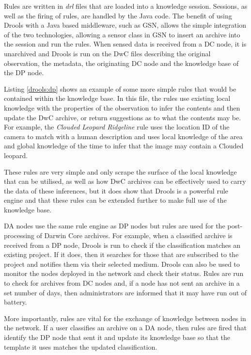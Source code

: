		Rules are written in \textit{drl} files that are loaded into a knowledge session. Sessions, as well as the firing of rules, are handled by the Java code. The benefit of using Drools with a Java based middleware, such as GSN, allows the simple integration of the two technologies, allowing a sensor class in GSN to insert an archive into the session and run the rules. When sensed data is received from a DC node, it is unarchived and Drools is run on the DwC files describing the original observation, the metadata, the originating DC node and the knowledge base of the DP node.
		
		Listing \ref{drools:dp} shows an example of some more simple rules that would be contained within the knowledge base. In this file, the rules use existing local knowledge with the properties of the observation to infer the contents and then update the DwC archive, or return suggestions as to what the contents may be. For example, the \textit{Clouded Leopard Ridgeline} rule uses the location ID of the camera to match with a human description and uses local knowledge of the area and global knowledge of the time to infer that the image may contain a Clouded leopard.
		
		
		
		These rules are very simple and only scrape the surface of the local knowledge that can be utilised, as well as how DwC archives can be effectively used to carry the data of these inferences, but it does show that Drools is a powerful rule engine and that these rules can be extended further to make full use of the knowledge base. 
		
		DA nodes use the same rule engine as DP nodes but rules are used for the post-processing of Darwin Core archives. For example, when a classified archive is received from a DP node, Drools is run to check if the classification matches an existing project. If it does, then it searches for those that are subscribed to the project and notifies them via their selected medium. Drools can also be used to monitor the nodes deployed in the network and check their status. Rules are run to check for archives from DC nodes and, if a node has not sent an archive in a set number of days, then administrators are informed that it may have run out of battery.
		
		More importantly, rules are vital for the exchange of knowledge between nodes in the network. If a user classifies an archive on a DA node, then rules are fired that identify the DP node that sent it and update its knowledge base so that the template it uses matches the updated classification.
		
